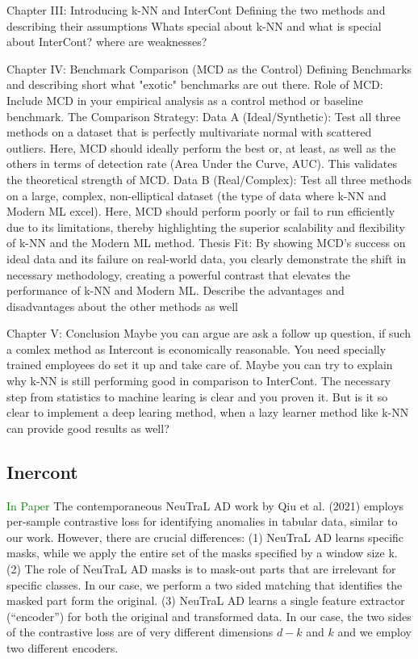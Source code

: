 Chapter III: Introducing k-NN and InterCont
Defining the two methods and describing their assumptions
Whats special about k-NN and what is special about InterCont?
where are weaknesses?


Chapter IV: Benchmark Comparison (MCD as the Control)
Defining Benchmarks and describing short what "exotic" benchmarks are out there.
Role of MCD: Include MCD in your empirical analysis as a control method or baseline benchmark.
The Comparison Strategy:
Data A (Ideal/Synthetic): Test all three methods on a dataset that is perfectly multivariate normal with scattered outliers. 
Here, MCD should ideally perform the best or, at least, as well as the others in terms of detection rate (Area Under the Curve, AUC). 
This validates the theoretical strength of MCD.
Data B (Real/Complex): Test all three methods on a large, complex, non-elliptical dataset (the type of data where k-NN and Modern ML excel). 
Here, MCD should perform poorly or fail to run efficiently due to its limitations, thereby highlighting the superior scalability and flexibility of k-NN and the Modern ML method.
Thesis Fit: By showing MCD's success on ideal data and its failure on real-world data, you clearly demonstrate the shift in necessary methodology, creating a powerful contrast that
elevates the performance of k-NN and Modern ML. Describe the advantages and disadvantages about the other methods as well


Chapter V: Conclusion
Maybe you can argue are ask a follow up question, if such a comlex method as Intercont is economically reasonable.
You need specially trained employees do set it up and take care of.
Maybe you can try to explain why k-NN is still performing good in comparison to InterCont.
The necessary step from statistics to machine learing is clear and you proven it. 
But is it so clear to implement a deep learing method, when a lazy learner method like k-NN can provide good results as well?


\subsection{Inercont}

\textcolor{green}{In Paper}
The contemporaneous NeuTraL AD work by Qiu et al. (2021) employs per-sample contrastive loss
for identifying anomalies in tabular data, similar to our work. However, there are crucial differences:
(1) NeuTraL AD learns specific masks, while we apply the entire set of the masks specified by a
window size k. (2) The role of NeuTraL AD masks is to mask-out parts that are irrelevant for specific
classes. In our case, we perform a two sided matching that identifies the masked part form the original.
(3) NeuTraL AD learns a single feature extractor (“encoder”) for both the original and transformed
data. In our case, the two sides of the contrastive loss are of very different dimensions $d - k$ and $k$
and we employ two different encoders. \cite[p.3]{shenkar2022anomaly}


